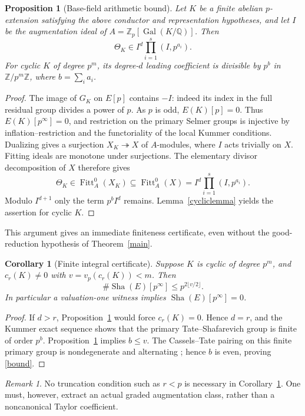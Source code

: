 \documentclass[11pt]{article}
\newtheorem{proposition}[theorem]{Proposition}
\newtheorem{corollary}[theorem]{Corollary}
\theoremstyle{remark}\newtheorem{remark}[theorem]{Remark}
\newcommand{\Z}{\mathbb Z}\newcommand{\Q}{\mathbb Q}\newcommand{\F}{\mathbb F}
\newcommand{\Sha}{\operatorname{Sha}}
\newcommand{\Fitt}{\operatorname{Fitt}}
\newcommand{\Gal}{\operatorname{Gal}}
\begin{document}
\begin{proposition}[Base-field arithmetic bound]\label{fitt}
Let $K$ be a finite abelian $p$-extension satisfying the above conductor and representation hypotheses, and let $I$ be the augmentation ideal of $A=\Z_p[\Gal(K/\Q)]$. Then
\begin{equation}
 \Theta_K\in I^d\prod_{i=1}^s(I,p^{a_i}).\label{fittmain}
\end{equation}
For cyclic $K$ of degree $p^m$, its degree-$d$ leading coefficient is divisible by $p^b$ in $\Z/p^m\Z$, where $b=\sum_i a_i$.
\end{proposition}
\begin{proof}
The image of $G_K$ on $E[p]$ contains $-I$: indeed its index in the full residual group divides a power of $p$. As $p$ is odd, $E(K)[p]=0$. Thus $E(K)[p^\infty]=0$, and restriction on the primary Selmer groups is injective by inflation--restriction and the functoriality of the local Kummer conditions. Dualizing gives a surjection $X_K\twoheadrightarrow X$ of $A$-modules, where $I$ acts trivially on $X$. Fitting ideals are monotone under surjections. The elementary divisor decomposition of $X$ therefore gives
\[
 \Theta_K\in\Fitt_A^0(X_K)\subseteq\Fitt_A^0(X)
 = I^d\prod_{i=1}^s(I,p^{a_i}).
\]
Modulo $I^{d+1}$ only the term $p^bI^d$ remains. Lemma~\ref{cycliclemma} yields the assertion for cyclic $K$.
\end{proof}
This argument gives an immediate finiteness certificate, even without the good-reduction hypothesis of Theorem~\ref{main}.
\begin{corollary}[Finite integral certificate]\label{cert}
Suppose $K$ is cyclic of degree $p^m$, and $c_r(K)\neq0$ with $v=v_p(c_r(K))<m$. Then
\begin{equation}
 \#\Sha(E)[p^\infty]\leq p^{2\lfloor v/2\rfloor}.\label{bound}
\end{equation}
In particular a valuation-one witness implies $\Sha(E)[p^\infty]=0$.
\end{corollary}
\begin{proof}
If $d>r$, Proposition~\ref{fitt} would force $c_r(K)=0$. Hence $d=r$, and the Kummer exact sequence shows that the primary Tate--Shafarevich group is finite of order $p^b$. Proposition~\ref{fitt} implies $b\leq v$. The Cassels--Tate pairing on this finite primary group is nondegenerate and alternating \cite{Cassels}; hence $b$ is even, proving \eqref{bound}.
\end{proof}
\begin{remark}
No truncation condition such as $r<p$ is necessary in Corollary~\ref{cert}. One must, however, extract an actual graded augmentation class, rather than a noncanonical Taylor coefficient.
\end{remark}
\end{document}
